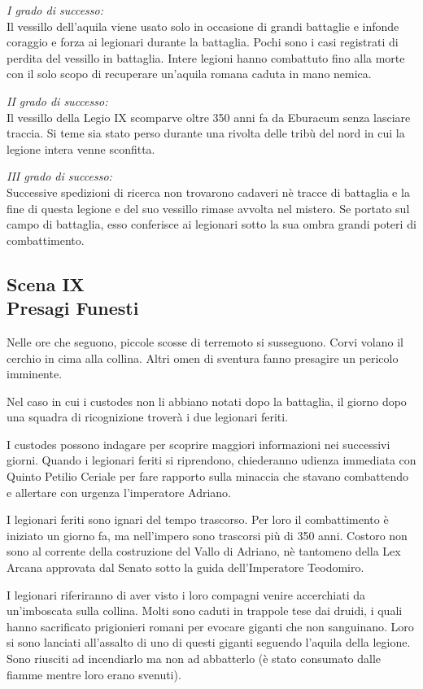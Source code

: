 \documentclass[11.5pt,twocolumn]{article}
\begin{document}
\emph{I grado di successo:}\\
Il vessillo dell'aquila viene usato solo in occasione di grandi battaglie e infonde coraggio e forza ai legionari durante la battaglia.
Pochi sono i casi registrati di perdita del vessillo in battaglia.
Intere legioni hanno combattuto fino alla morte con il solo scopo di recuperare un'aquila romana caduta in mano nemica.

\emph{II grado di successo:}\\
Il vessillo della Legio IX scomparve oltre 350 anni fa da Eburacum senza lasciare traccia.
Si teme sia stato perso durante una rivolta delle trib\`{u} del nord in cui la legione intera venne sconfitta.

\emph{III grado di successo:}\\
Successive spedizioni di ricerca non trovarono cadaveri n\`{e} tracce di battaglia e la fine di questa legione e del suo vessillo rimase avvolta nel mistero.
Se portato sul campo di battaglia, esso conferisce ai legionari sotto la sua ombra grandi poteri di combattimento.


\subsection*{Scena IX\\Presagi Funesti}
%
Nelle ore che seguono, piccole scosse di terremoto si susseguono.
Corvi volano il cerchio in cima alla collina.
Altri omen di sventura fanno presagire un pericolo imminente.

Nel caso in cui i custodes non li abbiano notati dopo la battaglia, il giorno dopo una squadra di ricognizione trover\`{a} i due legionari feriti.

I custodes possono indagare per scoprire maggiori informazioni nei successivi giorni.
Quando i legionari feriti si riprendono, chiederanno udienza immediata con Quinto Petilio Ceriale per fare rapporto sulla minaccia che stavano combattendo e allertare con urgenza l'imperatore Adriano.

I legionari feriti sono ignari del tempo trascorso.
Per loro il combattimento \`{e} iniziato un giorno fa, ma nell'impero sono trascorsi pi\`{u} di 350 anni.
Costoro non sono al corrente della costruzione del Vallo di Adriano, n\`{e} tantomeno della Lex Arcana approvata dal Senato sotto la guida dell'Imperatore Teodomiro.

I legionari riferiranno di aver visto i loro compagni venire accerchiati da un'imboscata sulla collina.
Molti sono caduti in trappole tese dai druidi, i quali hanno sacrificato prigionieri romani per evocare giganti che non sanguinano.
Loro si sono lanciati all'assalto di uno di questi giganti seguendo l'aquila della legione.
Sono riusciti ad incendiarlo ma non ad abbatterlo (\`{e} stato consumato dalle fiamme mentre loro erano svenuti).
\end{document}
